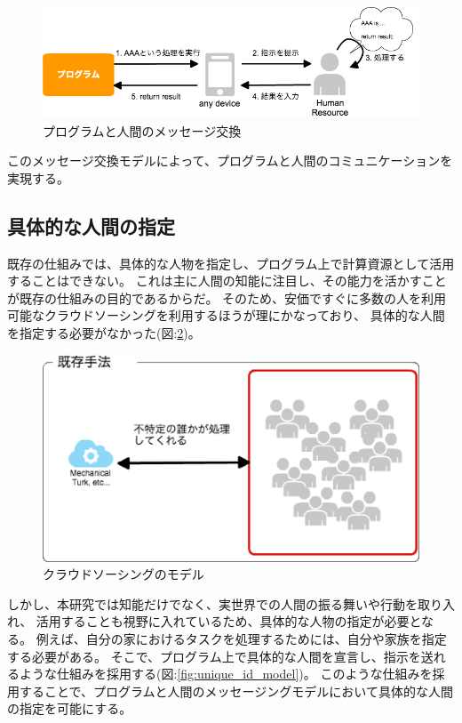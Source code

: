 \begin{figure}[htbp]
  \begin{center}
  \includegraphics[width=.7\linewidth,bb=0 0 790 233]{images/program-device-human-model.png}
  \end{center}
  \caption{プログラムと人間のメッセージ交換}
  \label{fig:program-device-human-model}
\end{figure}

このメッセージ交換モデルによって、プログラムと人間のコミュニケーションを実現する。

\subsection{具体的な人間の指定}\label{ux5177ux4f53ux7684ux306aux4ebaux9593ux306eux6307ux5b9a}

既存の仕組みでは、具体的な人物を指定し、プログラム上で計算資源として活用することはできない。
これは主に人間の知能に注目し、その能力を活かすことが既存の仕組みの目的であるからだ。
そのため、安価ですぐに多数の人を利用可能なクラウドソーシングを利用するほうが理にかなっており、
具体的な人間を指定する必要がなかった(図:\ref{fig:crowdsourcing_model})。

\begin{figure}[htbp]
  \begin{center}
  \includegraphics[width=.5\linewidth]{images/crowdsourcing_model.eps}
  \end{center}
  \caption{クラウドソーシングのモデル}
  \label{fig:crowdsourcing_model}
\end{figure}

しかし、本研究では知能だけでなく、実世界での人間の振る舞いや行動を取り入れ、
活用することも視野に入れているため、具体的な人物の指定が必要となる。
例えば、自分の家におけるタスクを処理するためには、自分や家族を指定する必要がある。
そこで、プログラム上で具体的な人間を宣言し、指示を送れるような仕組みを採用する(図:\ref{fig:unique_id_model})。
このような仕組みを採用することで、プログラムと人間のメッセージングモデルにおいて具体的な人間の指定を可能にする。

